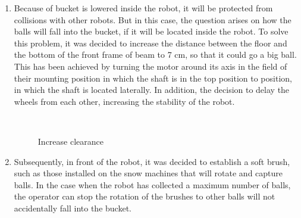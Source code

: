 \begin{enumerate}
\begin{enumerate}
      \item Because of bucket is lowered inside the robot, it will be protected from collisions with other robots. But in this case, the question arises on how the balls will fall into the bucket, if it will be located inside the robot. To solve this problem, it was decided to increase the distance between the floor and the bottom of the front frame of beam to 7 cm, so that it could go a big ball. This has been achieved by turning the motor around its axis in the field of their mounting position in which the shaft is in the top position to position, in which the shaft is located laterally. In addition, the decision to delay the wheels from each other, increasing the stability of the robot.
      
      \begin{figure}[H]
      	\begin{minipage}[h]{1\linewidth}
      		\caption{Increase clearance} 
      	\end{minipage}
      \end{figure}
        
      \item Subsequently, in front of the robot, it was decided to establish a soft brush, such as those installed on the snow machines that will rotate and capture balls. In the case when the robot has collected a maximum number of balls, the operator can stop the rotation of the brushes to other balls will not accidentally fall into the bucket.
      

\end{enumerate}
\end{enumerate}
